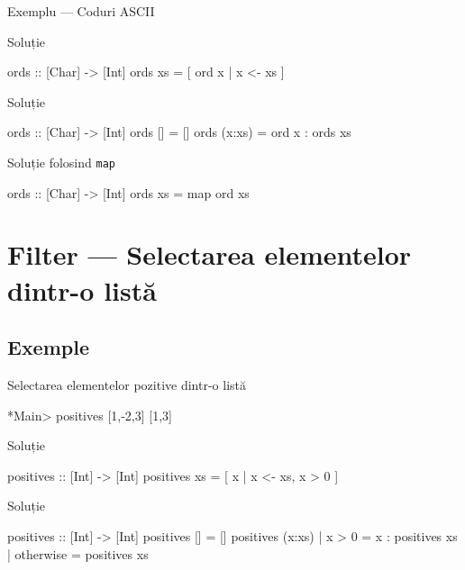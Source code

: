 \documentclass[handout,xcolor=pdftex,romanian,colorlinks]{beamer}
\begin{document}
\begin{frame}[fragile]
{Exemplu --- Coduri ASCII}
\begin{block}{Soluție }
\begin{asciihs}
ords :: [Char] -> [Int]
ords xs = [ ord x | x <- xs ]
\end{asciihs}
\end{block}
\begin{block}{Soluție }
\begin{asciihs}
ords :: [Char] -> [Int]
ords []     = []
ords (x:xs) = ord x : ords xs
\end{asciihs}
\end{block}
\begin{block}{Soluție folosind \lstinline$map$}
\begin{asciihs}
ords :: [Char] -> [Int]
ords xs = map ord xs
\end{asciihs}
\end{block}
\end{frame}

\section{Filter --- Selectarea elementelor dintr-o listă}
\subsection{Exemple}

\begin{frame}[fragile]{Selectarea elementelor pozitive dintr-o listă}
\begin{block}{}
\begin{asciihs}
*Main> positives [1,-2,3]
[1,3]
\end{asciihs}
\end{block}
\begin{block}{Soluție }
\begin{asciihs}
positives :: [Int] -> [Int]
positives xs = [ x | x <- xs, x > 0 ]
\end{asciihs}
\end{block}
\begin{block}{Soluție }
\begin{asciihs}
positives :: [Int] -> [Int]
positives []                 = []
positives (x:xs) | x > 0     = x : positives xs
                 | otherwise = positives xs
\end{asciihs}
\end{block}
\end{frame}
\end{document}

